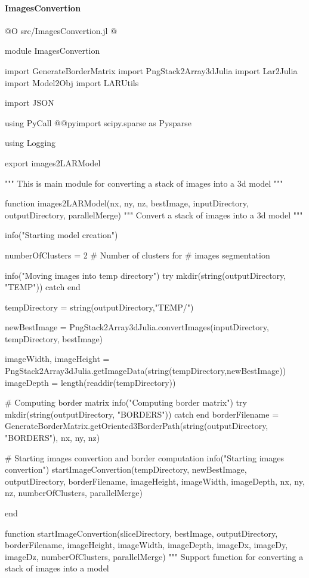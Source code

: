 \documentclass[11pt,oneside]{article}	%
\begin{document}
\paragraph{ImagesConvertion}
@O src/ImagesConvertion.jl
@{module ImagesConvertion

import GenerateBorderMatrix
import PngStack2Array3dJulia
import Lar2Julia
import Model2Obj
import LARUtils

import JSON

using PyCall
@@pyimport scipy.sparse as Pysparse

using Logging

export images2LARModel

"""
This is main module for converting a stack
of images into a 3d model
"""

function images2LARModel(nx, ny, nz, bestImage, inputDirectory, outputDirectory, parallelMerge)
  """
  Convert a stack of images into a 3d model
  """

  info("Starting model creation")

  numberOfClusters = 2 # Number of clusters for
                       # images segmentation

  info("Moving images into temp directory")
  try
    mkdir(string(outputDirectory, "TEMP"))
  catch
  end

  tempDirectory = string(outputDirectory,"TEMP/")

  newBestImage = PngStack2Array3dJulia.convertImages(inputDirectory, tempDirectory, bestImage)

  imageWidth, imageHeight = PngStack2Array3dJulia.getImageData(string(tempDirectory,newBestImage))
  imageDepth = length(readdir(tempDirectory))

  # Computing border matrix
  info("Computing border matrix")
  try
    mkdir(string(outputDirectory, "BORDERS"))
  catch
  end
  borderFilename = GenerateBorderMatrix.getOriented3BorderPath(string(outputDirectory, "BORDERS"), nx, ny, nz)

  # Starting images convertion and border computation
  info("Starting images convertion")
  startImageConvertion(tempDirectory, newBestImage, outputDirectory, borderFilename,
                       imageHeight, imageWidth, imageDepth,
                       nx, ny, nz,
                       numberOfClusters, parallelMerge)

end

function startImageConvertion(sliceDirectory, bestImage, outputDirectory, borderFilename,
                              imageHeight, imageWidth, imageDepth,
                              imageDx, imageDy, imageDz,
                              numberOfClusters, parallelMerge)
  """
  Support function for converting a stack of images into a model

}
\end{document}
